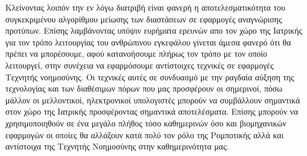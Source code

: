 Κλείνοντας λοιπόν την εν λόγω διατριβή είναι φανερή η αποτελεσματικότητα του συγκεκριμένου αλγορίθμου μείωσης των διαστάσεων σε εφαρμογές αναγνώρισης προτύπων. Επίσης λαμβάνοντας υπόψιν ευρήματα ερευνών απο τον χώρο της Ιατρικής για τον τρόπο λειτουργίας του ανθρώπινου εγκεφάλου γίνεται άμεσα φανερό ότι θα πρέπει να μπορέσουμε, αφού κατανοήσουμε πλήρως τον τρόπο με τον οποίο λειτουργεί, στην συνέχεια να εφαρμόσουμε αντίστοιχες τεχνικές σε εφαρμογές Τεχνητής νοημοσύνης. Οι τεχνικές αυτές σε συνδυασμό με την ραγδαία αύξηση της τεχνολογίας και των διαθέσιμων πόρων που μας προσφέρουν οι σημερινοί, πόσω μάλλον οι μελλοντικοί, ηλεκτρονικοί υπολογιστές μπορούν να συμβάλλουν σημαντικά στον χώρο της Ιατρικής προσφέροντας σημαντικά αποτελέσματα. Επίσης μπορούν να χρησιμοποιηθούν σε ένα μεγάλο πλήθος τόσο καθημερινών όσο και βιομηχανικών εφαρμογών οι οποίες θα αλλάξουν κατά πολύ τον ρόλο της Ρομποτικής αλλά και αντίστοιχα της Τεχνητής Νοημοσύνης στην καθημερινότητα μας.
